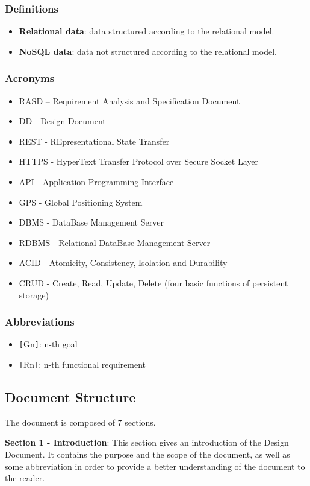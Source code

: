 \subsubsection{Definitions}
\begin{itemize}
\item \textbf{Relational data}: data structured according to the relational model.
\item \textbf{NoSQL data}: data not structured according to the relational model.
\end{itemize}
\subsubsection{Acronyms}
\begin{itemize}
\item RASD – Requirement Analysis and Specification Document
\item DD - Design Document
\item REST - REpresentational State Transfer
\item HTTPS - HyperText Transfer Protocol over Secure Socket Layer
\item API - Application Programming Interface
\item GPS - Global Positioning System
\item DBMS - DataBase Management Server
\item RDBMS - Relational DataBase Management Server
\item ACID - Atomicity, Consistency, Isolation and Durability
\item CRUD - Create, Read, Update, Delete (four basic functions of persistent storage)
\end{itemize}
\subsubsection{Abbreviations}
\begin{itemize}
\item \verb|[|Gn\verb|]|: n-th goal
\item \verb|[|Rn\verb|]|: n-th functional requirement
\end{itemize}

\subsection{Document Structure}
The document is composed of 7 sections.\newline

\textbf{Section 1 - Introduction}: This section gives an introduction of the Design Document. It contains the purpose and the scope of the document, as well as some abbreviation in order to provide a better understanding of the document to the reader.\newline

